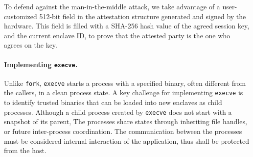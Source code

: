 To defend against the man-in-the-middle attack, we take advantage of
a user-customized 512-bit field
in the attestation structure generated and signed by the \sgx{} hardware.
This field is filled with a SHA-256 hash value of the agreed session key,
and the current enclave ID,
to prove that the attested party is the one who agrees on the key.


\paragraph{Implementing {\tt execve}.}
Unlike {\tt fork}, {\tt execve}
starts a process with a specified binary, often different from the callers,
in a clean process state.
A key challenge for implementing {\tt execve} is to
identify trusted binaries that can be loaded into new enclaves as child processes.
Although a child process created by {\tt execve} does not start with
a snapshot of its parent,
The processes share states through inheriting file handles,
or future inter-process coordination.
The communication between the processes must be considered internal interaction of the application,
thus shall be protected from the host.


